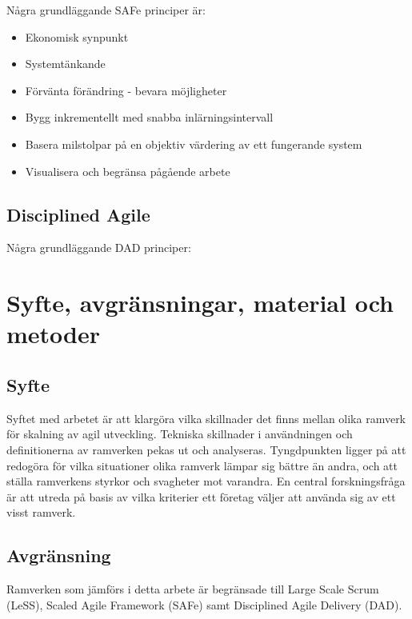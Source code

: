 	
	Några grundläggande SAFe principer är: \cite{safe_principles}
	\begin{itemize}
		\item Ekonomisk synpunkt
		\item Systemtänkande
		\item Förvänta förändring - bevara möjligheter
		\item Bygg inkrementellt med snabba inlärningsintervall
		\item Basera milstolpar på en objektiv värdering av ett fungerande system
		\item Visualisera och begränsa pågående arbete
	\end{itemize}
	
	
	\subsection{Disciplined Agile}
	
	
	Några grundläggande DAD principer: \cite{dad_principles}
	
	\newpage

\section{Syfte, avgränsningar, material och metoder}
	
	
	\subsection{Syfte}
	
	Syftet med arbetet är att klargöra vilka skillnader det finns mellan olika ramverk för skalning av agil utveckling. Tekniska skillnader i användningen och definitionerna av ramverken pekas ut och analyseras.
	Tyngdpunkten ligger på att redogöra för vilka situationer olika ramverk lämpar sig bättre än andra, och att ställa ramverkens styrkor och svagheter mot varandra. \newline
	En central forskningsfråga är att utreda på basis av vilka kriterier ett företag väljer att använda sig av ett visst ramverk.
	
	
	
	
	\subsection{Avgränsning}
	
	Ramverken som jämförs i detta arbete är begränsade till Large Scale Scrum (LeSS), Scaled Agile Framework (SAFe) samt Disciplined Agile Delivery (DAD).
	
